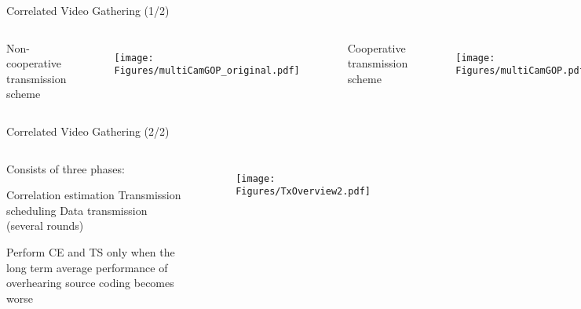 \begin{frame}{Correlated Video Gathering (1/2)}
\begin{columns}
\begin{itemize}
	\myItem Non-cooperative transmission scheme
\end{itemize}
\begin{figure}
\centering
\texttt{[image: Figures/multiCamGOP\_original.pdf]}
\end{figure}
\begin{itemize}
	\myItem Cooperative transmission scheme
\end{itemize}
\begin{figure}
\centering
\texttt{[image: Figures/multiCamGOP.pdf]}
\end{figure}
\end{columns}
\end{frame}
\begin{frame}{Correlated Video Gathering (2/2)}
\begin{columns}
\begin{itemize}
	\myItem Consists of three phases:
	\begin{itemize}
		\mySubItem Correlation estimation
		\mySubItem Transmission scheduling		
		\mySubItem Data transmission \\ (several rounds)
	\end{itemize}
	\myItem Perform CE and TS only when the long term average performance of overhearing source coding becomes worse
\end{itemize}
\begin{figure}
\centering
\texttt{[image: Figures/TxOverview2.pdf]}
\end{figure}
\end{columns}
\end{frame}